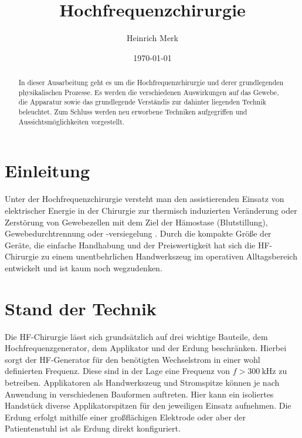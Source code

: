\documentclass[letterpaper,12pt]{article}
\begin{document}
	
	\title{Hochfrequenzchirurgie}
	\author{Heinrich Merk}
	\date{\today}
	\maketitle
	
	\begin{abstract}
		In dieser Ausarbeitung geht es um die Hochfrequenzchirurgie und derer grundlegenden physikalischen Prozesse. Es werden die verschiedenen Auswirkungen auf das Gewebe, die Apparatur sowie das grundlegende Verständis zur dahinter liegenden Technik beleuchtet. Zum Schluss werden neu erworbene Techniken aufgegriffen und Aussichtsmöglichkeiten vorgestellt.
		
	\end{abstract}
	
	\section{Einleitung}
	
		Unter der Hochfrequenzchirurgie versteht man den assistierenden Einsatz von elektrischer Energie in der Chirurgie zur thermisch induzierten Veränderung oder Zerstörung von Gewebezellen mit dem Ziel der Hämostase (Blutstillung), Gewebedurchtrennung oder -versiegelung \cite{kramme2016medizintechnik}. Durch die kompakte Größe der Geräte, die einfache Handhabung und der Preiswertigkeit hat sich die HF-Chirurgie zu einem unentbehrlichen Handwerkszeug im operativen Alltagsbereich entwickelt und ist kaum noch wegzudenken.
	
	\section{Stand der Technik}
	
		Die HF-Chirurgie lässt sich grundsätzlich auf drei wichtige Bauteile, dem Hochfrequenzgenerator, dem Applikator und der Erdung beschränken. Hierbei sorgt der HF-Generator für den benötigten Wechselstrom in einer wohl definierten Frequenz. Diese sind in der Lage eine Frequenz von $f>\SI{300}{\kilo\hertz}$ zu betreiben. Applikatoren als Handwerkszeug und Stromspitze können je nach Anwendung in verschiedenen Bauformen auftreten. Hier kann ein isoliertes Handstück diverse Applikatorspitzen für den jeweiligen Einsatz aufnehmen. Die Erdung erfolgt mithilfe einer großflächigen Elektrode oder aber der Patientenstuhl ist als Erdung direkt konfiguriert. 
		
\end{document}
